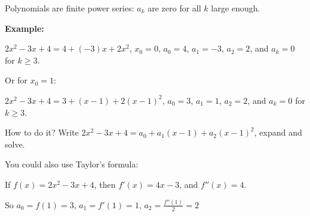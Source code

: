 \documentclass[10pt,aspectratio=169]{beamer}
\begin{document}
\begin{frame}
Polynomials are finite power series:
$a_k$ are zero for all $k$ large enough.

\pause
\medskip

\textbf{Example:}

\quad
$2x^2-3x+4 = 4 + (-3)x + 2 x^2$,
\quad
$x_0 = 0$, 
$a_0 = 4$, $a_1 = -3$, $a_2 = 2$, and $a_k = 0$ for $k \geq 3$.

\pause
\medskip

Or for $x_0 = 1$:

\medskip

\quad
$2x^2-3x+4 = 3 + (x-1) + 2{(x-1)}^2$,
\quad
$a_0 = 3$, $a_1 = 1$, $a_2 = 2$, and $a_k = 0$ for $k \geq 3$.

\medskip

\pause
How to do it? \pause Write
\quad
$2x^2-3x+4 = a_0 + a_1 (x-1) + a_2 {(x-1)}^2$,
\quad
expand and solve.

\pause
\medskip

You could also use Taylor's formula:

\medskip

If $f(x) = 2x^2-3x+4$, then
$f'(x) = 4x-3$, and $f''(x) = 4$.

So $a_0 = f(1) = 3$, $a_1 = f'(1) = 1$, $a_2 = \frac{f''(1)}{2} = 2$

\end{frame}
\end{document}
